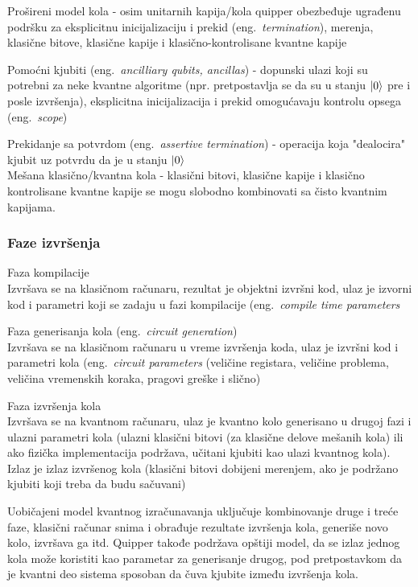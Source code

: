 \documentclass[a4paper]{article}
\begin{document}
{Prošireni model kola - osim unitarnih kapija/kola quipper obezbeđuje ugrađenu podršku za eksplicitnu inicijalizaciju i prekid (eng.~\emph{termination}), merenja, klasične bitove, klasične kapije i klasično-kontrolisane kvantne kapije 

Pomoćni kjubiti (eng.~\emph{ancilliary qubits, ancillas}) - dopunski ulazi koji su potrebni za neke kvantne algoritme (npr. pretpostavlja se da su u stanju $\ket{0}$ pre i posle izvršenja), eksplicitna inicijalizacija i prekid omogućavaju kontrolu opsega (eng.~\emph{scope})

Prekidanje sa potvrdom (eng.~\emph{assertive termination}) - operacija koja "dealocira" kjubit uz potvrdu da je u stanju $\ket{0}$\\

Mešana klasično/kvantna kola - klasični bitovi, klasične kapije i klasično kontrolisane kvantne kapije se mogu slobodno kombinovati sa čisto kvantnim kapijama.

\subsubsection{Faze izvršenja}

Faza kompilacije\\
Izvršava se na klasičnom računaru, rezultat je objektni izvršni kod, ulaz je izvorni kod i parametri koji se zadaju u fazi kompilacije (eng.~\emph{compile time parameters}

Faza generisanja kola (eng.~\emph{circuit generation})\\
Izvršava se na klasičnom računaru u vreme izvršenja koda, ulaz je izvršni kod i parametri kola (eng.~\emph{circuit parameters} (veličine registara, veličine problema, veličina vremenskih koraka, pragovi greške i slično)

Faza izvršenja kola\\
Izvršava se na kvantnom računaru, ulaz je kvantno kolo generisano u drugoj fazi i ulazni parametri kola (ulazni klasični bitovi (za klasične delove mešanih kola) ili ako fizička implementacija podržava, učitani kjubiti kao ulazi kvantnog kola). Izlaz je izlaz izvršenog kola (klasični bitovi dobijeni merenjem, ako je podržano kjubiti koji treba da budu sačuvani)

Uobičajeni model kvantnog izračunavanja uključuje kombinovanje druge i treće faze, klasični računar snima i obrađuje rezultate izvršenja kola, generiše novo kolo, izvršava ga itd. Quipper takođe podržava opštiji model, da se izlaz jednog kola može koristiti kao parametar za generisanje drugog, pod pretpostavkom da je kvantni deo sistema sposoban da čuva kjubite između izvršenja kola.

}
\end{document}
